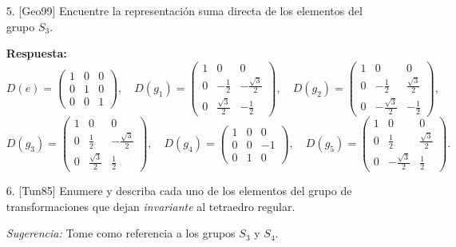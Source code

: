 \documentclass[a4paper,12pt]{article}
\begin{document}
\begin{enumerate}
    \item [5.] [Geo99] Encuentre la representación suma directa de los elementos del grupo $S_3$.

    \textbf{Respuesta:}
    $$
    D(e) = \begin{pmatrix} 1 & 0 & 0 \\ 0 & 1 & 0 \\ 0 & 0 & 1 \end{pmatrix}, \quad D(g_1) = \begin{pmatrix} 1 & 0 & 0 \\ 0 & -\frac{1}{2} & -\frac{\sqrt{3}}{2} \\ 0 & \frac{\sqrt{3}}{2} & -\frac{1}{2} \end{pmatrix}, \quad D(g_2) = \begin{pmatrix} 1 & 0 & 0 \\ 0 & -\frac{1}{2} & \frac{\sqrt{3}}{2} \\ 0 & -\frac{\sqrt{3}}{2} & -\frac{1}{2} \end{pmatrix},
    $$
    $$
    D(g_3) = \begin{pmatrix} 1 & 0 & 0 \\ 0 & \frac{1}{2} & -\frac{\sqrt{3}}{2} \\ 0 & \frac{\sqrt{3}}{2} & \frac{1}{2} \end{pmatrix}, \quad D(g_4) = \begin{pmatrix} 1 & 0 & 0 \\ 0 & 0 & -1 \\ 0 & 1 & 0 \end{pmatrix}, \quad D(g_5) = \begin{pmatrix} 1 & 0 & 0 \\ 0 & \frac{1}{2} & \frac{\sqrt{3}}{2} \\ 0 & -\frac{\sqrt{3}}{2} & \frac{1}{2} \end{pmatrix}.
    $$

    \item [6.] [Tun85] Enumere y describa cada uno de los elementos del grupo de transformaciones que dejan \textit{invariante} al tetraedro regular.


    \textit{Sugerencia:} Tome como referencia a los grupos $S_3$ y $S_4$.

\end{enumerate}
\end{document}
